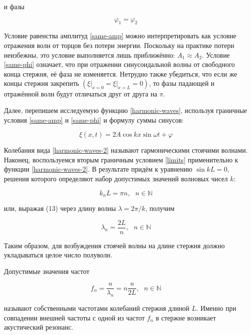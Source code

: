\documentclass[a4paper,12pt]{article}
\begin{document}
и фазы

\begin{equation}\label{same-phi}
    \varphi_1 = \varphi_2
\end{equation}

Условие равенства амплитуд \eqref{same-amp} можно интерпретировать как условие отражения волн от торцов без потери энергии. Поскольку на практике потери неизбежны, это условие выполняется лишь приближённо: $A_1 \approx A_2$. Условие \eqref{same-phi} означает, что при отражении синусоидальной волны от свободного конца стержня, её фаза не изменяется. Нетрудно также убедиться, что если же концы стержня закрепить $\left ( \xi \big|_{x = 0} = \xi \big|_{x = L} = 0 \right )$, то фазы падающей и отражённой волн будут отличаться друг от друга на $\pi$.

Далее, перепишем исследуемую функцию \eqref{harmonic-waves}, используя граничные условия \eqref{same-amp} и \eqref{same-phi} и формулу суммы синусов:

\begin{equation}\label{harmonic-waves-2}
    \xi (x, t) = 2 A \cos{kx} \sin{\omega t + \varphi}
\end{equation}

Колебания вида \eqref{harmonic-waves-2} называют гармоническими стоячими волнами. Наконец, воспользуемся вторым граничным условием \eqref{limits} применительно к функции \eqref{harmonic-waves-2}. В результате придём к уравнению $\sin{kL} = 0$, решения которого определяют набор допустимых значений волновых чисел $k$:

\begin{equation}\label{k}
    k_n L = \pi n, \ \ \ n \in \mathbb{N}
\end{equation}

или, выражая (13) через длину волны $\lambda = 2 \pi / k$, получим

\begin{equation}
    \lambda_n = \frac{2L}{n}, \ \ \ n \in \mathbb{N}
\end{equation}

Таким образом, для возбуждения стоячей волны на длине стержня должно укладываться целое число полуволн. 

Допустимые значения частот

\begin{equation}\label{linear-f}
    f_n = \frac{u}{\lambda_n} = n \frac{u}{2L}, \ \ \ n \in \mathbb{N}
\end{equation}

называют собственными частотами колебаний стержня длиной $L$. Именно при совпадении внешней частоты с одной из частот $f_n$ в стержне возникает акустический резонанс.
\end{document}
